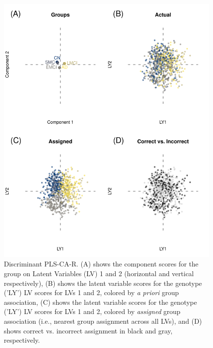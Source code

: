 \documentclass[12pt]{article}
\begin{document}
\begin{figure}[!hbtp]

{\centering \includegraphics[width=.8\textwidth,height=.8\textheight]{PLSCAR_to_a_GPLS_files/figure-latex/unnamed-chunk-5-1} 

}

\caption{\label{fig:discriminant_ex1} Discriminant PLS-CA-R. (A) shows the component scores for the group on Latent Variables (LV) 1 and 2 (horizontal and vertical respectively), (B) shows the latent variable scores for the genotype ('LY') LV scores for LVs 1 and 2, colored by \textit{a priori} group association, (C) shows the latent variable scores for the genotype ('LY') LV scores for LVs 1 and 2, colored by \textit{assigned} group association (i.e., nearest group assignment across all LVs), and (D) shows correct vs. incorrect assignment in black and gray, respectively.}\label{fig:unnamed-chunk-5}
\end{figure}
\end{document}
